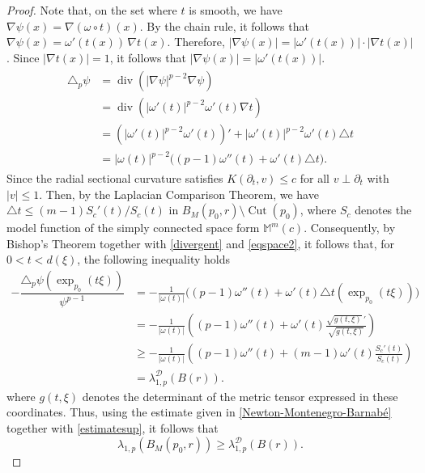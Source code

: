 \documentclass{article}
\begin{document}
\begin{proof}
Note that, on the set where $t$ is smooth, we have $\nabla \psi(x) = \nabla (\omega \circ t)(x)$. By the chain rule, it follows that $\nabla \psi(x) = \omega'(t(x))\,\nabla t(x)$. Therefore, $|\nabla \psi(x)| = |\omega'(t(x))|\cdot |\nabla t(x)|$. Since $|\nabla t(x)| = 1$, it follows that $|\nabla \psi(x)| = |\omega'(t(x))|$.
\begin{eqnarray}\label{divergent}
    \begin{aligned}
      \triangle_p \psi &=  \operatorname{div}(|\nabla \psi|^{p-2}\nabla \psi) \\
      &= \operatorname{div}(|\omega' (t)|^{p-2}\omega'(t)\nabla t) \\
      &= (|\omega' (t)|^{p-2}\omega'(t))' + |\omega' (t)|^{p-2}\omega'(t) \triangle t \\
      &= | \omega(t)|^{p-2} \big( (p-1)\omega''(t) + \omega'(t) \triangle t \big).
    \end{aligned}
\end{eqnarray}
Since the radial sectional curvature satisfies
$K(\partial_t,v) \leq c$ for all $v \perp \partial_t$ with $|v| \leq 1$.
Then, by the Laplacian Comparison Theorem, we have $\triangle t \leq (m-1){S_c'(t)}/{S_c(t)}$ in  $B_M(p_0,r)\setminus \operatorname{Cut}(p_0)$, where $S_c$ denotes the model function of the simply connected space form $\mathbb{M}^m(c)$. Consequently, by Bishop's Theorem together with \eqref{divergent} and \eqref{eqspace2}, it follows that, for $0 < t < d(\xi)$, the following inequality holds
\begin{equation}\label{estimatesup}
\begin{aligned}
   -\dfrac{\triangle_p \psi(\exp_{p_0}(t \xi))}{\psi^{p-1}} &= -\frac{1}{|\omega(t)|} \big( (p-1)\omega''(t) + \omega'(t) \triangle t(\exp_{p_0}(t \xi)) \big) \\
&= -\frac{1}{|\omega(t)|} \left( (p-1)\omega''(t) + \omega'(t) \frac{\sqrt{g(t,\xi)}\,'}{\sqrt{g(t,\xi)}} \right) \\
&\geq  -\frac{1}{|\omega(t)|} \left( (p-1)\omega''(t) + (m-1)\omega'(t) \frac{S_c'(t)}{S_c(t)} \right) \\
&= \lambda_{1,p}^{\mathcal{D}}(B(r)).
\end{aligned}    
\end{equation}
where $g(t,\xi)$ denotes the determinant of the metric tensor expressed in these
coordinates. Thus, using the estimate given in \eqref{Newton-Montenegro-Barnabé} together with \eqref{estimatesup}, it follows that
\begin{equation*}
    \lambda_{1,p}(B_M(p_0,r)) \geq \lambda_{1,p}^{\mathcal{D}}(B(r)).
\end{equation*}


\end{proof}
\end{document}

